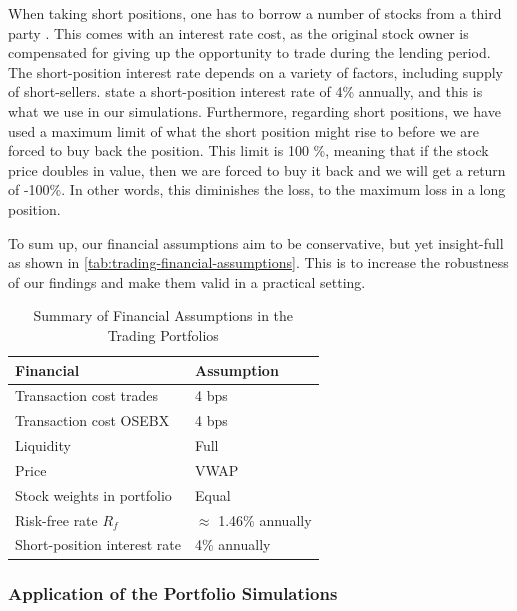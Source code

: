 When taking short positions, one has to borrow a number of stocks from a third party \parencite{jacobs-long-short}. This comes with an interest rate cost, as the original stock owner is compensated for giving up the opportunity to trade during the lending period. The short-position interest rate depends on a variety of factors, including supply of short-sellers. \textcite{nordnet-short-interest-rate} state a short-position interest rate of 4\% annually, and this is what we use in our simulations. Furthermore, regarding short positions, we have used a maximum limit of what the short position might rise to before we are forced to buy back the position. This limit is 100 \%, meaning that if the stock price doubles in value, then we are forced to buy it back and we will get a return of -100\%. In other words, this diminishes the loss, to the maximum loss in a long position.

To sum up, our financial assumptions aim to be conservative, but yet insight-full as shown in \autoref{tab:trading-financial-assumptions}. This is to increase the robustness of our findings and make them valid in a practical setting. 

\begin{table}[H]
\centering
\begin{tabular}{ll}
\hline
Financial & Assumption \\
\hline
Transaction cost trades   & 4 bps   \\ 
Transaction cost OSEBX  & 4 bps \\
Liquidity   & Full \\ 
Price  & VWAP \\ 
Stock weights in portfolio  & Equal \\ 
Risk-free rate $R_f$ & $\approx$ 1.46\% annually \\
Short-position interest rate & 4\% annually \\
\hline
\end{tabular}
\vspace{1em}
\caption{{Summary of Financial Assumptions in the Trading Portfolios}}
\label{tab:trading-financial-assumptions}
\end{table}

\subsubsection{Application of the Portfolio Simulations}

